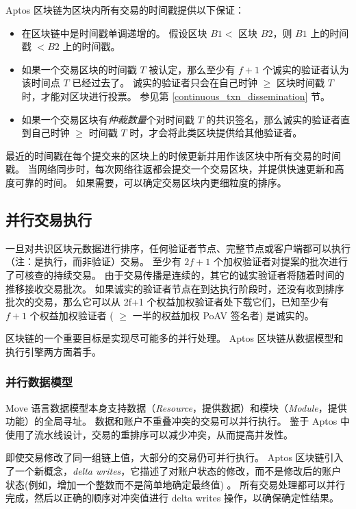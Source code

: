 \documentclass{article}
\begin{document}
Aptos 区块链为区块内所有交易的时间戳提供以下保证：

\begin{itemize}
\item 
在区块链中是时间戳单调递增的。 假设区块 $B1 < $  区块 $B2$，则 $B1$ 上的时间戳 $< B2$ 上的时间戳。

\item 如果一个交易区块的时间戳 $T$ 被认定，那么至少有 $f+1$ 个诚实的验证者认为该时间点 $T$ 已经过去了。 诚实的验证者只会在自己时钟 $\ge$ 区块时间戳 $T$ 时，才能对区块进行投票。 参见第 \ref{continuous_txn_dissemination} 节。
\item 如果一个交易区块有\emph{仲裁数量}个对时间戳 $T$ 的共识签名，那么诚实的验证者直到自己时钟 $\ge$ 时间戳 $T$ 时，才会将此类区块提供给其他验证者。

\end{itemize}

最近的时间戳在每个提交来的区块上的时候更新并用作该区块中所有交易的时间戳。 当网络同步时，每次网络往返都会提交一个交易区块，并提供快速更新和高度可靠的时间。 如果需要，可以确定交易区块内更细粒度的排序。


\subsection{并行交易执行}
\label{subsec:parallel_transaction_execution}
一旦对共识区块元数据进行排序，任何验证者节点、完整节点或客户端都可以执行（注：是执行，而非验证）交易。 至少有 $2f+1$  个加权验证者对提案的批次进行了可核查的持续交易。 由于交易传播是连续的，其它的诚实验证者将随着时间的推移接收交易批次。 如果诚实的验证者节点在到达执行阶段时，还没有收到排序批次的交易，那么它可以从 2f+1 个权益加权验证者处下载它们，已知至少有 $f+1$ 个权益加权验证者 ( $\ge$ 一半的权益加权 PoAV 签名者) 是诚实的。

区块链的一个重要目标是实现尽可能多的并行处理。 Aptos 区块链从数据模型和执行引擎两方面着手。

\subsubsection{并行数据模型}

Move 语言数据模型本身支持数据（\emph{Resource}，提供数据）和模块（\emph{Module}，提供功能）的全局寻址。 数据和账户不重叠冲突的交易可以并行执行。 鉴于 Aptos 中使用了流水线设计，交易的重排序可以减少冲突，从而提高并发性。

即使交易修改了同一组链上值，大部分的交易仍可并行执行。 Aptos 区块链引入了一个新概念，\emph{delta writes}，它描述了对账户状态的修改，而不是修改后的账户状态(例如，增加一个整数而不是简单地确定最终值) 。 所有交易处理都可以并行完成，然后以正确的顺序对冲突值进行 delta writes 操作，以确保确定性结果。
\end{document}
